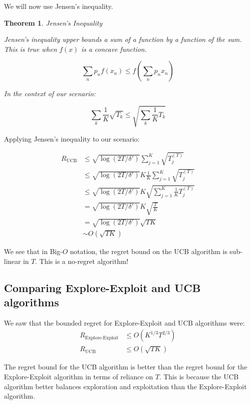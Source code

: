 \documentclass[11pt]{article}
\newtheorem{theorem}{Theorem}
\begin{document}
We will now use Jensen's inequality.

\begin{theorem}{Jensen's Inequality}

Jensen's inequality upper bounds a sum of a function by a function of the sum. This is true when $f(x)$ is a concave function.

\begin{equation}
\sum_n p_n f(x_n) \leq f(\sum_n p_n x_n)
\end{equation}

In the context of our scenario:

\begin{equation}
    \sum_k \frac{1}{K} \sqrt{T_k} \leq \sqrt{\sum_k \frac{1}{K} T_k}
\end{equation}

\end{theorem}


Applying Jensen's inequality to our scenario:

\begin{align}
    R_{\text{UCB}} &\leq \sqrt{\log(2T/\delta')} \sum_{j=1}^K \sqrt{T_j^{(T)}} \\
    &\leq \sqrt{\log(2T/\delta')} K \frac{1}{K}\sum_{j=1}^K \sqrt{T_j^{(T)}} \\
    &\leq \sqrt{\log(2T/\delta')} K \sqrt{\sum_{j=1}^K \frac{1}{K} T_j^{(T)}} \\
    &= \sqrt{\log(2T/\delta')} K \sqrt{\frac{T}{K}} \\
    &= \sqrt{\log(2T/\delta')} \sqrt{TK} \\
    &\sim O(\sqrt{TK})
\end{align}

We see that in Big-$O$ notation, the regret bound on the UCB algorithm is sub-linear in $T$. This is a no-regret algorithm!


\subsection{Comparing Explore-Exploit and UCB algorithms}
We saw that the bounded regret for Explore-Exploit and UCB algorithms were:
\begin{align}
    R_{\text{Explore-Exploit}} &\leq  O(K^{1/3}T^{2/3}) \\
    R_{\text{UCB}} &\leq  O(\sqrt{TK})
\end{align}

The regret bound for the UCB algorithm is better than the regret bound for the Explore-Exploit algorithm in terms of reliance on $T$. This is because the UCB algorithm better balances exploration and exploitation than the Explore-Exploit algorithm.
\end{document}
